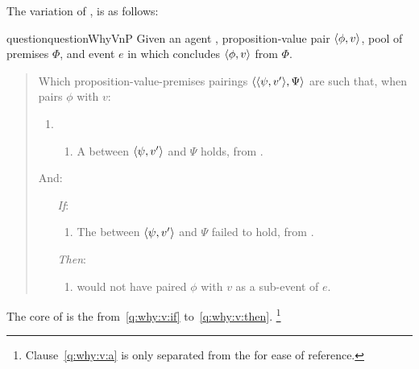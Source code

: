 \begin{note}
  The variation of \qWhy{}, \qWhyVnP{} is as follows:

  \begin{restatable}[\qWhyVnP{}]{question}{questionWhyVnP}
    \label{q:why:v:nP}
    Given an agent \vAgent{}, proposition-value pair \(\langle \phi, v \rangle\), pool of premises \(\Phi\), and event \(e\) in which \vAgent{} concludes \(\langle \phi, v \rangle\) from \(\Phi\).

    \begin{quote}
      Which proposition-value-premises pairings \(\langle \langle \psi, v' \rangle, \Psi \rangle\) are such that, when \vAgent{} pairs \(\phi\) with \(v\):

      \begin{enumerate}[label=]
      \item
        \begin{enumerate}[label=\alph*., ref=(\alph*), series=qWhyVnPdef]
        \item
          \label{q:why:v:a}
          A  between \(\langle \psi, v' \rangle\) and \(\Psi\) holds, from .
        \end{enumerate}
      \end{enumerate}

      And:

      \begin{enumerate}
      \item[\emph{If}:]
        \begin{enumerate}[label=\alph*., ref=(\alph*), resume*=qWhyVnPdef]
        \item
          \label{q:why:v:if}
          The  between \(\langle \psi, v' \rangle\) and \(\Psi\) failed to hold, from .
        \end{enumerate}
      \item[\emph{Then}:]
        \begin{enumerate}[label=\alph*., ref=(\alph*), resume*=qWhyVnPdef]
        \item
          \label{q:why:v:then}
          \vAgent{} would not have paired \(\phi\) with \(v\) as a sub-event of \(e\).
        \end{enumerate}
      \end{enumerate}
    \end{quote}
    \vspace{-\baselineskip}
  \end{restatable}

  The core of \qWhyVnP{} is the \qWVitc{} from~\ref{q:why:v:if} to~\ref{q:why:v:then}.%
  \footnote{
    Clause~\ref{q:why:v:a} is only separated from the \qWVitc{} for ease of reference.

}
\end{note}

